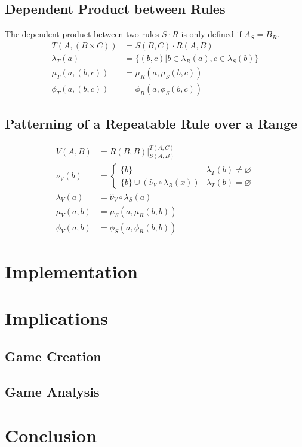\documentclass{article}
\theoremstyle{definition}
\theoremstyle{plain}
\begin{document}
\subsection{Dependent Product between Rules}
The dependent product between two rules $ S \cdot R $ is only defined if $ A_S = B_R $.
\begin{align}
          T (A, (B \times C)) & = S (B, C) \cdot R (A, B) \\
  \lambda_T (a)               & = \{ (b,c) | b \in \lambda_R (a), c \in \lambda_S (b) \} \\
      \mu_T (a, (b, c))       & =   \mu_R (a,  \mu_S (b, c)) \\
     \phi_T (a, (b, c))       & =  \phi_R (a, \phi_S (b, c)) 
\end{align}

\subsection{Patterning of a Repeatable Rule over a Range}

\begin{align}
     V (A, B)    & = R (B, B) \bigg\rvert_{S (A, B)}^{T (A, C)} \\
    \nu_V (b)    & = \begin{cases} \{ b \} & \lambda_T (b) \neq \varnothing \\ \{ b \} \cup (\widehat{\nu}_V \circ \lambda_R (x)) & \lambda_T (b) = \varnothing \end{cases} \\
\lambda_V (a)    & = \widehat{\nu}_V \circ \lambda_S (a) \\
    \mu_V (a, b) & =  \mu_S (a,  \mu_R(b, b)) \\
   \phi_V (a, b) & = \phi_S (a, \phi_R(b, b)) 
\end{align}

\section{Implementation}

\section{Implications}

\subsection{Game Creation}

\subsection{Game Analysis}

\section{Conclusion}
\end{document}
